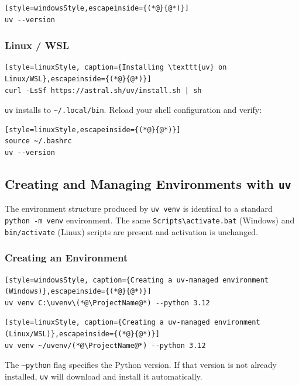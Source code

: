\begin{lstlisting}[style=windowsStyle,escapeinside={(*@}{@*)}]
uv --version
\end{lstlisting}

\subsubsection{Linux / WSL}

\begin{lstlisting}[style=linuxStyle, caption={Installing \texttt{uv} on Linux/WSL},escapeinside={(*@}{@*)}]
curl -LsSf https://astral.sh/uv/install.sh | sh
\end{lstlisting}

\texttt{uv} installs to \texttt{\textasciitilde/.local/bin}. Reload
your shell configuration and verify:

\begin{lstlisting}[style=linuxStyle,escapeinside={(*@}{@*)}]
source ~/.bashrc
uv --version
\end{lstlisting}

\subsection{Creating and Managing Environments with \texttt{uv}}

The environment structure produced by \texttt{uv venv} is identical to
a standard \texttt{python -m venv} environment. The same
\texttt{Scripts\textbackslash activate.bat} (Windows) and
\texttt{bin/activate} (Linux) scripts are present and activation is
unchanged.

\subsubsection{Creating an Environment}

\begin{lstlisting}[style=windowsStyle, caption={Creating a uv-managed environment (Windows)},escapeinside={(*@}{@*)}]
uv venv C:\uvenv\(*@\ProjectName@*) --python 3.12
\end{lstlisting}

\begin{lstlisting}[style=linuxStyle, caption={Creating a uv-managed environment (Linux/WSL)},escapeinside={(*@}{@*)}]
uv venv ~/uvenv/(*@\ProjectName@*) --python 3.12
\end{lstlisting}

The \texttt{--python} flag specifies the Python version. If that
version is not already installed, \texttt{uv} will download and
install it automatically.

